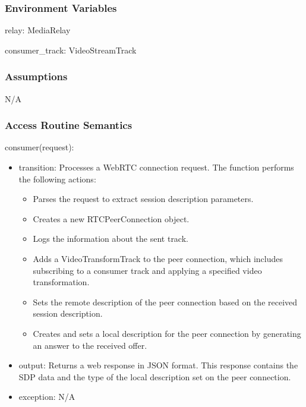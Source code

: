 \documentclass[12pt, titlepage]{article}
\begin{document}
\subsubsection{Environment Variables}
relay: MediaRelay

consumer\_track: VideoStreamTrack

\subsubsection{Assumptions}
N/A

\subsubsection{Access Routine Semantics}

\noindent consumer(request):
\begin{itemize}
\item transition: Processes a WebRTC connection request. The function performs the
  following actions:
  \begin{itemize}
  \item Parses the request to extract session description parameters.
  \item Creates a new RTCPeerConnection object.
  \item Logs the information about the sent track.
  \item Adds a VideoTransformTrack to the peer connection, which includes subscribing
    to a consumer track and applying a specified video transformation.
  \item Sets the remote description of the peer connection based on the received session description.
  \item Creates and sets a local description for the peer connection by generating an answer to the received offer.
  \end{itemize}
\item output: Returns a web response in JSON format. This response contains the SDP
  data and the type of the local description set on the peer connection.
\item exception: N/A
\end{itemize}
\end{document}
